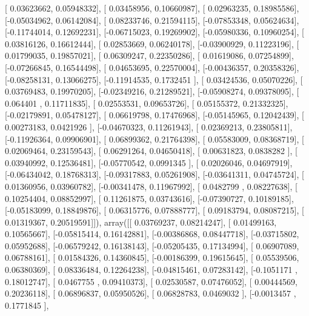 \documentclass{article}
\begin{document}
       [ 0.03623662,  0.05948332],
       [ 0.03458956,  0.10660987],
       [ 0.02963235,  0.18985586],
       [-0.05034962,  0.06142084],
       [ 0.08233746,  0.21594115],
       [-0.07853348,  0.05624634],
       [-0.11744014,  0.12692231],
       [-0.06715023,  0.19269902],
       [-0.05980336,  0.10960254],
       [ 0.03816126,  0.16612444],
       [ 0.02853669,  0.06240178],
       [-0.03900929,  0.11223196],
       [ 0.01799035,  0.19857021],
       [ 0.06309247,  0.22350286],
       [ 0.01619086,  0.07254899],
       [-0.07266845,  0.16544498],
       [ 0.04653695,  0.22570004],
       [-0.00436357,  0.20358326],
       [-0.08258131,  0.13066275],
       [-0.11914535,  0.1732451 ],
       [ 0.03424536,  0.05070226],
       [ 0.03769483,  0.19970205],
       [-0.02349216,  0.21289521],
       [-0.05908274,  0.09378095],
       [ 0.064401  ,  0.11711835],
       [ 0.02553531,  0.09653726],
       [ 0.05155372,  0.21332325],
       [-0.02179891,  0.05478127],
       [ 0.06619798,  0.17476968],
       [-0.05145965,  0.12042439],
       [ 0.00273183,  0.0421926 ],
       [-0.04670323,  0.11261943],
       [ 0.02369213,  0.23805811],
       [-0.11926364,  0.09906901],
       [ 0.06899362,  0.21764398],
       [ 0.05583009,  0.08368719],
       [ 0.02069464,  0.23159543],
       [ 0.06291264,  0.04650418],
       [ 0.00631823,  0.0838282 ],
       [ 0.03940992,  0.12536481],
       [-0.05770542,  0.0991345 ],
       [ 0.02026046,  0.04697919],
       [-0.06434042,  0.18768313],
       [-0.09317883,  0.05261908],
       [-0.03641311,  0.04745724],
       [ 0.01360956,  0.03960782],
       [-0.00341478,  0.11967992],
       [ 0.0482799 ,  0.08227638],
       [ 0.10254404,  0.08852997],
       [ 0.11261875,  0.03743616],
       [-0.07390727,  0.10189185],
       [-0.05183099,  0.18849876],
       [ 0.06315776,  0.07888777],
       [ 0.09183794,  0.08087215],
       [ 0.01319367,  0.20519591]]), array([[ 0.03769237,  0.08214247],
       [ 0.01499163,  0.10565667],
       [-0.05815414,  0.16142881],
       [-0.00386868,  0.08447718],
       [-0.03715802,  0.05952688],
       [-0.06579242,  0.16138143],
       [-0.05205435,  0.17134994],
       [ 0.06907089,  0.06788161],
       [ 0.01584326,  0.14360845],
       [-0.00186399,  0.19615645],
       [ 0.05539506,  0.06380369],
       [ 0.08336484,  0.12264238],
       [-0.04815461,  0.07283142],
       [-0.1051171 ,  0.18012747],
       [ 0.0467755 ,  0.09410373],
       [ 0.02530587,  0.07476052],
       [ 0.00444569,  0.20236118],
       [ 0.06896837,  0.05950526],
       [ 0.06828783,  0.0469032 ],
       [-0.0013457 ,  0.1771845 ],
\end{document}
